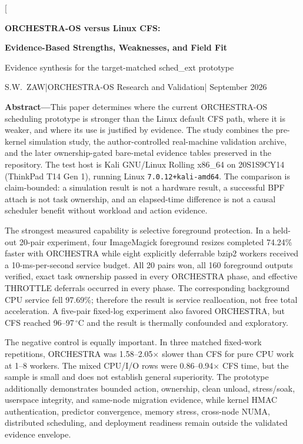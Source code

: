 \documentclass[10pt,letterpaper,twocolumn]{article}
\newcommand{\hostid}{20S1S9CY14 (ThinkPad T14 Gen 1)}
\newcommand{\AUTHOR}{S.W.\ ZAW}
\begin{document}
\twocolumn[
\begin{center}
  {\Large\bfseries\sffamily ORCHESTRA-OS versus Linux CFS:\par}
  \vspace{0.15em}
  {\Large\bfseries\sffamily Evidence-Based Strengths, Weaknesses, and Field Fit\par}
  \vspace{0.45em}
  {\normalsize Evidence synthesis for the target-matched sched\_ext prototype\par}
  \vspace{0.12em}
  {\footnotesize \AUTHOR\quad |\quad ORCHESTRA-OS Research and Validation\quad | September 2026\par}
\end{center}
\vspace{0.28em}
\begin{minipage}{0.965\textwidth}
\noindent\textbf{Abstract---}This paper determines where the current ORCHESTRA-OS scheduling prototype is stronger than the Linux default CFS path, where it is weaker, and where its use is justified by evidence. The study combines the pre-kernel simulation study, the author-controlled real-machine validation archive, and the later ownership-gated bare-metal evidence tables preserved in the repository. The test host is Kali GNU/Linux Rolling x86\_64 on \hostid, running Linux \texttt{7.0.12+kali-amd64}. The comparison is claim-bounded: a simulation result is not a hardware result, a successful BPF attach is not task ownership, and an elapsed-time difference is not a causal scheduler benefit without workload and action evidence.

The strongest measured capability is selective foreground protection. In a held-out 20-pair experiment, four ImageMagick foreground resizes completed 74.24\% faster with ORCHESTRA while eight explicitly deferrable bzip2 workers received a 10-ms-per-second service budget. All 20 pairs won, all 160 foreground outputs verified, exact task ownership passed in every ORCHESTRA phase, and effective THROTTLE deferrals occurred in every phase. The corresponding background CPU service fell 97.69\%; therefore the result is service reallocation, not free total acceleration. A five-pair fixed-log experiment also favored ORCHESTRA, but CFS reached 96--97\,$^\circ$C and the result is thermally confounded and exploratory.

The negative control is equally important. In three matched fixed-work repetitions, ORCHESTRA was 1.58--2.05$\times$ slower than CFS for pure CPU work at 1--8 workers. The mixed CPU/I/O rows were 0.86--0.94$\times$ CFS time, but the sample is small and does not establish general superiority. The prototype additionally demonstrates bounded action, ownership, clean unload, stress/soak, userspace integrity, and same-node migration evidence, while kernel HMAC authentication, predictor convergence, memory stress, cross-node NUMA, distributed scheduling, and deployment readiness remain outside the validated evidence envelope.


\end{minipage}
\end{document}
